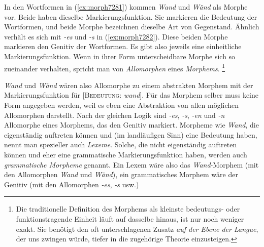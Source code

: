 \begin{exe}
  \ex\label{ex:morph7281}
  \begin{xlist}
  \end{xlist}
  \ex\label{ex:morph7282}
  \begin{xlist}
  \end{xlist}
  \ex\label{ex:morph7283}
  \begin{xlist}
  \end{xlist}
\end{exe}

In den Wortformen in (\ref{ex:morph7281}) kommen \textit{Wand} und \textit{Wänd} als Morphe vor.
Beide haben dieselbe Markierungsfunktion.
Sie markieren die Bedeutung der Wortformen, und beide Morphe bezeichnen dieselbe Art von Gegenstand.
Ähnlich verhält es sich mit \textit{-es} und \textit{-s} in (\ref{ex:morph7282}).
Diese beiden Morphe markieren den Genitiv der Wortformen.
Es gibt also jeweils eine einheitliche Markierungsfunktion.
Wenn in ihrer Form unterscheidbare Morphe sich so zueinander verhalten, spricht man von \textit{Allomorphen} eines \textit{Morphems}.%
\footnote{Die traditionelle Definition des Morphems als kleinste bedeutungs- oder funktionstragende Einheit läuft auf dasselbe hinaus, ist nur noch weniger exakt.
Sie benötigt \zB den oft unterschlagenen Zusatz \textit{auf der Ebene der Langue}, der uns zwingen würde, tiefer in die zugehörige Theorie einzusteigen.}


\textit{Wand} und \textit{Wänd} wären also Allomorphe zu einem abstrakten Morphem mit der Markierungsfunktion für [\textsc{Bedeutung}: \textit{wand}].
Für das Morphem selber muss keine Form angegeben werden, weil es eben eine Abstraktion von allen möglichen Allomorphen darstellt.
Nach der gleichen Logik sind \textit{-es}, \textit{-s}, \textit{-en} und \textit{-n} Allomorphe eines Morphems, das den Genitiv markiert.
Morpheme wie \textit{Wand}, die eigenständig auftreten können und (im landläufigen Sinn) eine Bedeutung haben, nennt man spezieller auch \textit{Lexeme}.
Solche, die nicht eigenständig auftreten können und eher eine grammatische Markierungsfunktion haben, werden auch \textit{grammatische Morpheme} genannt.
Ein Lexem wäre also das \textit{Wand}-Morphem (mit den Allomorphen \textit{Wand} und \textit{Wänd}), ein grammatisches Morphem wäre der Genitiv (mit den Allomorphen \textit{-es}, \textit{-s} usw.)

